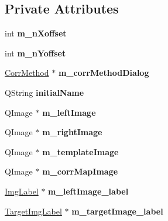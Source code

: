 \subsection*{Private Attributes}
\begin{DoxyCompactItemize}
\item 
\hypertarget{classQcorr_a49ad0fbdccdce18062eb17bb3ead20ce}{
int {\bfseries m\_\-nXoffset}}
\label{classQcorr_a49ad0fbdccdce18062eb17bb3ead20ce}

\item 
\hypertarget{classQcorr_a882514fa3899bfa373660f643ee85cf7}{
int {\bfseries m\_\-nYoffset}}
\label{classQcorr_a882514fa3899bfa373660f643ee85cf7}

\item 
\hypertarget{classQcorr_a6509fcbf4cd8925aa109cc53e638b69a}{
\hyperlink{classCorrMethod}{CorrMethod} $\ast$ {\bfseries m\_\-corrMethodDialog}}
\label{classQcorr_a6509fcbf4cd8925aa109cc53e638b69a}

\item 
\hypertarget{classQcorr_a3430716ddbe203f677095c163da87f86}{
QString {\bfseries initialName}}
\label{classQcorr_a3430716ddbe203f677095c163da87f86}

\item 
\hypertarget{classQcorr_ae8bdd4be8a0c3023be34a1301b28c913}{
QImage $\ast$ {\bfseries m\_\-leftImage}}
\label{classQcorr_ae8bdd4be8a0c3023be34a1301b28c913}

\item 
\hypertarget{classQcorr_aae1695d731f191c694186e00b96f469e}{
QImage $\ast$ {\bfseries m\_\-rightImage}}
\label{classQcorr_aae1695d731f191c694186e00b96f469e}

\item 
\hypertarget{classQcorr_a5594d939890f10991da0009e4c32bea3}{
QImage $\ast$ {\bfseries m\_\-templateImage}}
\label{classQcorr_a5594d939890f10991da0009e4c32bea3}

\item 
\hypertarget{classQcorr_ac7dc2785613864bea2d8bb0b5f009f36}{
QImage $\ast$ {\bfseries m\_\-corrMapImage}}
\label{classQcorr_ac7dc2785613864bea2d8bb0b5f009f36}

\item 
\hypertarget{classQcorr_acadb3032fbf41f8f1b27067c2784efef}{
\hyperlink{classImgLabel}{ImgLabel} $\ast$ {\bfseries m\_\-leftImage\_\-label}}
\label{classQcorr_acadb3032fbf41f8f1b27067c2784efef}

\item 
\hypertarget{classQcorr_a8d1e1ab866a811003c435c45de1e958e}{
\hyperlink{classTargetImgLabel}{TargetImgLabel} $\ast$ {\bfseries m\_\-targetImage\_\-label}}
\label{classQcorr_a8d1e1ab866a811003c435c45de1e958e}


\end{DoxyCompactItemize}
